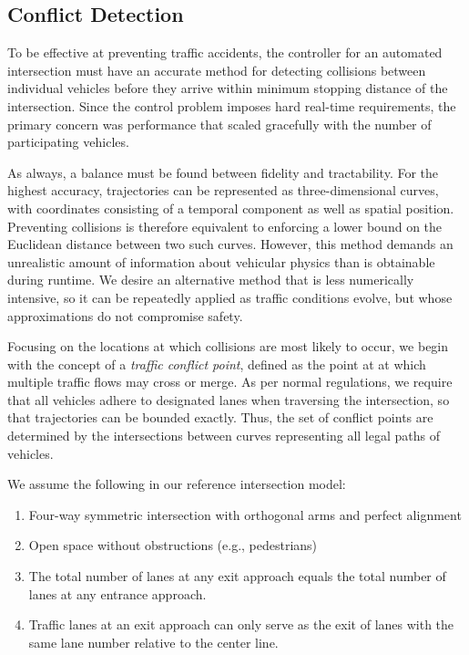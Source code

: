 \subsection{Conflict Detection}

To be effective at preventing traffic accidents, the controller for an
automated intersection must have an accurate method for detecting
collisions between individual vehicles before they arrive within minimum
stopping distance of the intersection.  Since the control problem
imposes hard real-time requirements, the primary concern was performance
that scaled gracefully with the number of participating vehicles.

As always, a balance must be found between fidelity and tractability.
For the highest accuracy, trajectories can be represented as
three-dimensional curves, with coordinates consisting of a temporal
component as well as spatial position.  Preventing collisions is
therefore equivalent to enforcing a lower bound on the Euclidean
distance between two such curves.  However, this method demands an
unrealistic amount of information about vehicular physics than is
obtainable during runtime.  We desire an alternative method that is
less numerically intensive, so it can be repeatedly applied as traffic
conditions evolve, but whose approximations do not compromise safety.

Focusing on the locations at which collisions are most likely to occur,
we begin with the concept of a \emph{traffic conflict point}, defined
as the point at at which multiple traffic flows may cross or merge.
As per normal regulations, we require that all vehicles adhere to
designated lanes when traversing the intersection, so that trajectories
can be bounded exactly.  Thus, the set of conflict points are determined
by the intersections between curves representing all legal paths of
vehicles.

We assume the following in our reference intersection model:
\begin{enumerate}
\setlength{\itemsep}{0pt}
\setlength{\parskip}{0pt}
\item Four-way symmetric intersection with orthogonal arms and
	perfect alignment
\item Open space without obstructions (e.g., pedestrians)
\item The total number of lanes at any exit approach equals the
	total number of lanes at any entrance approach.
\item Traffic lanes at an exit approach can only serve as the
	exit of lanes with the same lane number relative to
	the center line.
\end{enumerate}

